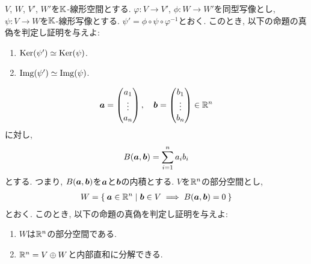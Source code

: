 \begin{quiz}
  $V$, $W$, $V'$, $W'$を$\mathbb{K}$-線形空間とする.
  $\varphi\colon V\to V'$,
  $\phi\colon W\to W'$を同型写像とし,
  $\psi\colon V\to W$を$\mathbb{K}$-線形写像とする.
  $\psi'=\phi\circ\psi\circ\varphi^{-1}$とおく.
  このとき,
  以下の命題の真偽を判定し証明を与えよ:
  \begin{enumerate}
  \item $\operatorname{Ker}(\psi')\simeq\operatorname{Ker}(\psi)$.
  \item $\operatorname{Img}(\psi')\simeq\operatorname{Img}(\psi)$.
  \end{enumerate}
\end{quiz}

\begin{quiz}
  \begin{align*}
    \boldsymbol{a}=\begin{pmatrix}a_1\\\vdots\\a_n\end{pmatrix},\quad
    \boldsymbol{b}=\begin{pmatrix}b_1\\\vdots\\b_n\end{pmatrix}\in\mathbb{R}^n
  \end{align*}
  に対し,
  \begin{align*}
    B(\boldsymbol{a},\boldsymbol{b})=\sum_{i=1}^n a_ib_i
  \end{align*}
  とする.
  つまり, $B(\boldsymbol{a},\boldsymbol{b})$を$\boldsymbol{a}$と$\boldsymbol{b}$の内積とする.
  $V$を$\mathbb{R}^n$の部分空間とし,
  \begin{align*}
    W=\Set{\boldsymbol{a}\in \mathbb{R}^n|\boldsymbol{b}\in V\implies B(\boldsymbol{a},\boldsymbol{b})=0}
  \end{align*}
  とおく.
  このとき,
  以下の命題の真偽を判定し証明を与えよ:
  \begin{enumerate}
  \item
    $W$は$\mathbb{R}^n$の部分空間である.
  \item
    $\mathbb{R}^n=V\oplus W$と内部直和に分解できる.
  \end{enumerate}
\end{quiz}

